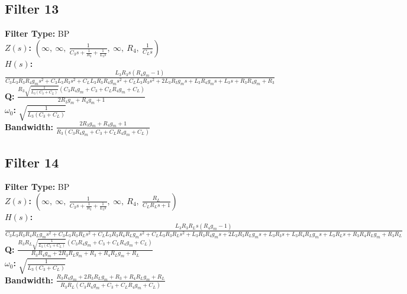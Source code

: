 \documentclass{article}
\begin{document}
\subsection*{Filter 13}
\textbf{Filter Type:} BP \\ 
\textbf{$Z(s)$:} $\left( \infty, \  \infty, \  \frac{1}{C_{3} s + \frac{1}{R_{3}} + \frac{1}{L_{3} s}}, \  \infty, \  R_{4}, \  \frac{1}{C_{L} s}\right)$ \\ 
\textbf{$H(s)$:} $\frac{L_{3} R_{3} s \left(R_{4} g_{m} - 1\right)}{C_{3} L_{3} R_{3} R_{4} g_{m} s^{2} + C_{3} L_{3} R_{3} s^{2} + C_{L} L_{3} R_{3} R_{4} g_{m} s^{2} + C_{L} L_{3} R_{3} s^{2} + 2 L_{3} R_{3} g_{m} s + L_{3} R_{4} g_{m} s + L_{3} s + R_{3} R_{4} g_{m} + R_{3}}$ \\ 
\textbf{Q:} $\frac{R_{3} \sqrt{\frac{1}{L_{3} \left(C_{3} + C_{L}\right)}} \left(C_{3} R_{4} g_{m} + C_{3} + C_{L} R_{4} g_{m} + C_{L}\right)}{2 R_{3} g_{m} + R_{4} g_{m} + 1}$ \\ 
\textbf{$\omega_0$:} $\sqrt{\frac{1}{L_{3} \left(C_{3} + C_{L}\right)}}$ \\ 
\textbf{Bandwidth:} $\frac{2 R_{3} g_{m} + R_{4} g_{m} + 1}{R_{3} \left(C_{3} R_{4} g_{m} + C_{3} + C_{L} R_{4} g_{m} + C_{L}\right)}$ \\ 
\subsection*{Filter 14}
\textbf{Filter Type:} BP \\ 
\textbf{$Z(s)$:} $\left( \infty, \  \infty, \  \frac{1}{C_{3} s + \frac{1}{R_{3}} + \frac{1}{L_{3} s}}, \  \infty, \  R_{4}, \  \frac{R_{L}}{C_{L} R_{L} s + 1}\right)$ \\ 
\textbf{$H(s)$:} $\frac{L_{3} R_{3} R_{L} s \left(R_{4} g_{m} - 1\right)}{C_{3} L_{3} R_{3} R_{4} R_{L} g_{m} s^{2} + C_{3} L_{3} R_{3} R_{L} s^{2} + C_{L} L_{3} R_{3} R_{4} R_{L} g_{m} s^{2} + C_{L} L_{3} R_{3} R_{L} s^{2} + L_{3} R_{3} R_{4} g_{m} s + 2 L_{3} R_{3} R_{L} g_{m} s + L_{3} R_{3} s + L_{3} R_{4} R_{L} g_{m} s + L_{3} R_{L} s + R_{3} R_{4} R_{L} g_{m} + R_{3} R_{L}}$ \\ 
\textbf{Q:} $\frac{R_{3} R_{L} \sqrt{\frac{1}{L_{3} \left(C_{3} + C_{L}\right)}} \left(C_{3} R_{4} g_{m} + C_{3} + C_{L} R_{4} g_{m} + C_{L}\right)}{R_{3} R_{4} g_{m} + 2 R_{3} R_{L} g_{m} + R_{3} + R_{4} R_{L} g_{m} + R_{L}}$ \\ 
\textbf{$\omega_0$:} $\sqrt{\frac{1}{L_{3} \left(C_{3} + C_{L}\right)}}$ \\ 
\textbf{Bandwidth:} $\frac{R_{3} R_{4} g_{m} + 2 R_{3} R_{L} g_{m} + R_{3} + R_{4} R_{L} g_{m} + R_{L}}{R_{3} R_{L} \left(C_{3} R_{4} g_{m} + C_{3} + C_{L} R_{4} g_{m} + C_{L}\right)}$ \\ 
\end{document}
